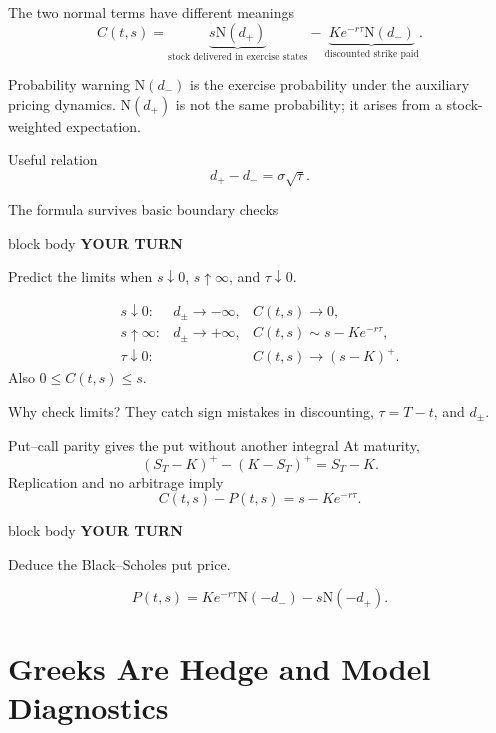 \documentclass[handout,10pt,aspectratio=169]{beamer}
\newenvironment{pausebox}{%
  \begin{beamercolorbox}[rounded=true,sep=0.8em,wd=\textwidth]{block body}
  \textbf{\color{CourseGold}YOUR TURN}\quad
}{\end{beamercolorbox}}
\newcommand{\Ncdf}{\mathrm N}
\newcommand{\1}{\mathbf 1}
\begin{document}
\begin{frame}{The two normal terms have different meanings}
\[
C(t,s)
=\underbrace{s\Ncdf(d_+)}_{\text{stock delivered in exercise states}}
-\underbrace{Ke^{-r\tau}\Ncdf(d_-)}_{\text{discounted strike paid}}.
\]
\begin{alertblock}{Probability warning}
\(\Ncdf(d_-)\) is the exercise probability under the auxiliary pricing
dynamics. \(\Ncdf(d_+)\) is not the same probability; it arises from a
stock-weighted expectation.
\end{alertblock}
\begin{block}{Useful relation}
\[
d_+-d_-=\sigma\sqrt{\tau}.
\]
\end{block}
\end{frame}

\begin{frame}{The formula survives basic boundary checks}
\begin{pausebox}
Predict the limits when \(s\downarrow0\), \(s\uparrow\infty\), and
\(\tau\downarrow0\).
\end{pausebox}

\[
\begin{array}{lll}
s\downarrow0: & d_\pm\to-\infty, & C(t,s)\to0,\\
s\uparrow\infty: & d_\pm\to+\infty, & C(t,s)\sim s-Ke^{-r\tau},\\
\tau\downarrow0: & & C(t,s)\to(s-K)^+.
\end{array}
\]
Also \(0\le C(t,s)\le s\).
\begin{exampleblock}{Why check limits?}
They catch sign mistakes in discounting, \(\tau=T-t\), and \(d_\pm\).
\end{exampleblock}
\end{frame}

\begin{frame}{Put--call parity gives the put without another integral}
At maturity,
\[
(S_T-K)^+-(K-S_T)^+=S_T-K.
\]
Replication and no arbitrage imply
\[
\boxed{C(t,s)-P(t,s)=s-Ke^{-r\tau}.}
\]
\begin{pausebox}
Deduce the Black--Scholes put price.
\end{pausebox}

\[
\boxed{
P(t,s)
=Ke^{-r\tau}\Ncdf(-d_-)-s\Ncdf(-d_+).}
\]
\end{frame}

\section{Greeks Are Hedge and Model Diagnostics}
\end{document}
